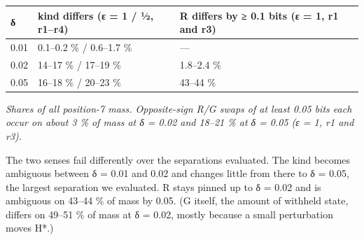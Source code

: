 \documentclass[10pt]{article}
\begin{document}
\begin{longtable}[]{@{}lll@{}}
\toprule
\begin{minipage}[b]{0.30\columnwidth}\raggedright
δ\strut
\end{minipage} & \begin{minipage}[b]{0.30\columnwidth}\raggedright
kind differs (ε = 1 / ½, r1--r4)\strut
\end{minipage} & \begin{minipage}[b]{0.30\columnwidth}\raggedright
R differs by ≥ 0.1 bits (ε = 1, r1 and r3)\strut
\end{minipage}\tabularnewline
\midrule
\endhead
\begin{minipage}[t]{0.30\columnwidth}\raggedright
0.01\strut
\end{minipage} & \begin{minipage}[t]{0.30\columnwidth}\raggedright
0.1--0.2 \% / 0.6--1.7 \%\strut
\end{minipage} & \begin{minipage}[t]{0.30\columnwidth}\raggedright
---\strut
\end{minipage}\tabularnewline
\begin{minipage}[t]{0.30\columnwidth}\raggedright
0.02\strut
\end{minipage} & \begin{minipage}[t]{0.30\columnwidth}\raggedright
14--17 \% / 17--19 \%\strut
\end{minipage} & \begin{minipage}[t]{0.30\columnwidth}\raggedright
1.8--2.4 \%\strut
\end{minipage}\tabularnewline
\begin{minipage}[t]{0.30\columnwidth}\raggedright
0.05\strut
\end{minipage} & \begin{minipage}[t]{0.30\columnwidth}\raggedright
16--18 \% / 20--23 \%\strut
\end{minipage} & \begin{minipage}[t]{0.30\columnwidth}\raggedright
43--44 \%\strut
\end{minipage}\tabularnewline
\bottomrule
\end{longtable}

\emph{Shares of all position-7 mass. Opposite-sign R/G swaps of at least 0.05 bits each occur on about 3 \% of mass at
δ = 0.02 and 18--21 \% at δ = 0.05 (ε = 1, r1 and r3).}

The two senses fail differently over the separations evaluated. The kind becomes ambiguous between δ = 0.01 and 0.02
and changes little from there to δ = 0.05, the largest separation we evaluated. R stays pinned up to δ = 0.02 and is
ambiguous on 43--44 \% of mass by 0.05. (G itself, the amount of withheld state, differs
on 49--51 \% of mass at δ = 0.02, mostly because a small perturbation moves H*.)
\end{document}
